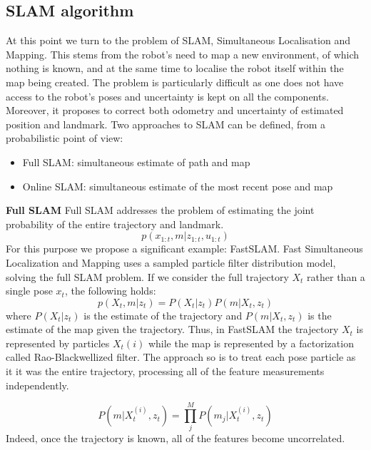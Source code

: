 \subsection{SLAM algorithm}
At this point we turn to the problem of SLAM, Simultaneous Localisation and Mapping. This stems from the robot's need to map a new environment, of which nothing is known, and at the same time to localise the robot itself within the map being created. The problem is particularly difficult as one does not have access to the robot's poses and uncertainty is kept on all the components.
Moreover, it proposes to correct both odometry and uncertainty of estimated position and landmark.
Two approaches to SLAM can be defined, from a probabilistic point of view:
\begin{itemize}
    \item Full SLAM: simultaneous estimate of path and map
    \item Online SLAM: simultaneous estimate of the most recent pose and map
\end{itemize}

\textbf{Full SLAM}
Full SLAM addresses the problem of estimating the joint probability of the entire trajectory and landmark.
\begin{equation}
    p(x_{1:t}, m | z_{1:t},u_{1:t})
\end{equation}
For this purpose we propose a significant example: FastSLAM.
Fast Simultaneous Localization and Mapping uses a sampled particle filter distribution model, solving the full SLAM problem.
If we consider the full trajectory $X_{t}$ rather than a single pose $x_{t}$, the following holds:
\begin{equation}
    p(X_{t}, m | z_{t}) = P(X_{t}| z_{t}) P(m | X_{t}, z_{t})
\end{equation}
where $P(X_{t}| z_{t})$ is the estimate of the trajectory and $P(m | X_{t}, z_{t})$ is the estimate of the map given the trajectory.
Thus, in FastSLAM the trajectory $X_{t}$ is represented by particles $X_{t}(i)$ while the map is represented by a factorization called Rao-Blackwellized filter.
The approach so is to treat each pose particle as it it was the entire trajectory, processing all of the feature measurements independently.

\begin{equation}
    P(m | X_{t}^{(i)},z_{t}) = \prod_{j}^{M} P(m_{j} | X_{t}^{(i)},z_{t})
\end{equation}
Indeed, once the trajectory is known, all of the features become uncorrelated.

